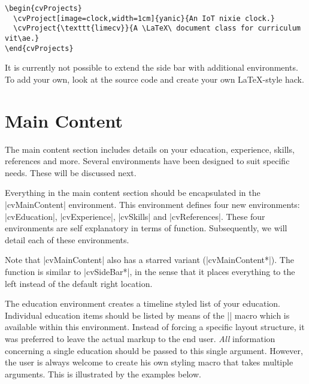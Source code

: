 \documentclass{ltxdoc}
\begin{document}
  \begin{lstlisting}
\begin{cvProjects}
  \cvProject[image=clock,width=1cm]{yanic}{An IoT nixie clock.}
  \cvProject{\texttt{limecv}}{A \LaTeX\ document class for curriculum vit\ae.}
\end{cvProjects}
  \end{lstlisting}
  
  It is currently not possible to extend the side bar with additional environments. To add your own, look at the source code and create your own \LaTeX-style hack.  

\section{Main Content}

  The main content section includes details on your education, experience, skills, references and more. Several environments have been designed to suit specific needs. These will be discussed next.
  
  Everything in the main content section should be encapsulated in the |cvMainContent| environment. This environment defines four new environments: |cvEducation|, |cvExperience|, |cvSkills| and |cvReferences|. These four environments are self explanatory in terms of function. Subsequently, we will detail each of these environments.
  
  Note that |cvMainContent| also has a starred variant (|cvMainContent*|). The function is similar to |cvSideBar*|, in the sense that it places everything to the left instead of the default right location.
  
  The education environment creates a timeline styled list of your education. Individual education items should be listed by means of the || macro which is available within this environment. Instead of forcing a specific layout structure, it was preferred to leave the actual markup to the end user. \emph{All} information concerning a single education should be passed to this single argument. However, the user is always welcome to create his own styling macro that takes multiple arguments. This is illustrated by the examples below.
  
\end{document}
